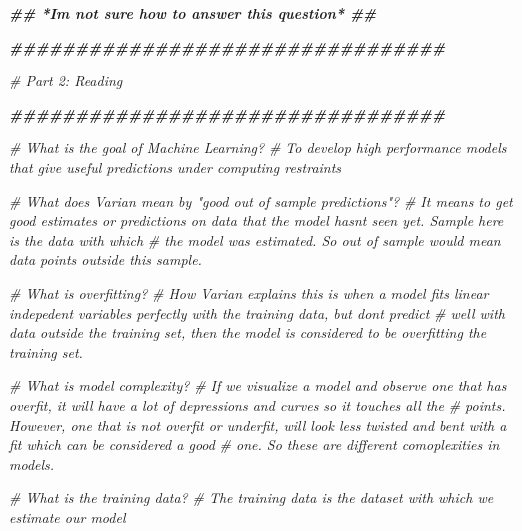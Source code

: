 \documentclass[
]{article}
\newenvironment{Shaded}{\begin{snugshade}}{\end{snugshade}}
\newcommand{\CommentTok}[1]{\textcolor[rgb]{0.56,0.35,0.01}{\textit{#1}}}
\newcommand{\DocumentationTok}[1]{\textcolor[rgb]{0.56,0.35,0.01}{\textbf{\textit{#1}}}}
\begin{document}
\begin{Shaded}
\begin{Highlighting}[]
\DocumentationTok{\#\# *I\textquotesingle{}m not sure how to answer this question* \#\#}


\DocumentationTok{\#\#\#\#\#\#\#\#\#\#\#\#\#\#\#\#\#\#\#\#\#\#\#\#\#\#\#\#\#\#\#\#\#}

\CommentTok{\# Part 2: Reading}

\DocumentationTok{\#\#\#\#\#\#\#\#\#\#\#\#\#\#\#\#\#\#\#\#\#\#\#\#\#\#\#\#\#\#\#\#\#}

\CommentTok{\# What is the goal of Machine Learning? }
\CommentTok{\# To develop high performance models that give useful predictions under computing restraints }

\CommentTok{\# What does Varian mean by "good out of sample predictions"?}
\CommentTok{\# It means to get good estimates or predictions on data that the model hasn\textquotesingle{}t seen yet. Sample here is the data with which }
\CommentTok{\# the model was estimated. So out of sample would mean data points outside this sample. }

\CommentTok{\# What is overfitting?}
\CommentTok{\# How Varian explains this is when a model fits linear indepedent variables perfectly with the training data, but don\textquotesingle{}t predict}
\CommentTok{\# well with data outside the training set, then the model is considered to be overfitting the training set. }

\CommentTok{\# What is model complexity?}
\CommentTok{\# If we visualize a model and observe one that has overfit, it will have a lot of depressions and curves so it touches all the }
\CommentTok{\# points. However, one that is not overfit or underfit, will look less twisted and bent with a fit which can be considered a good}
\CommentTok{\# one. So these are different comoplexities in models. }

\CommentTok{\# What is the training data?}
\CommentTok{\# The training data is the dataset with which we estimate our model}
\end{Highlighting}
\end{Shaded}
\end{document}
